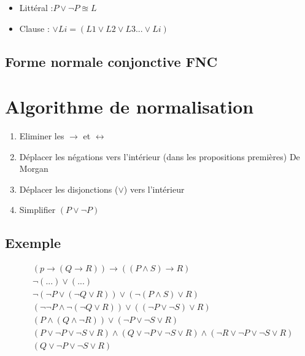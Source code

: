 \begin{itemize}
	\item Littéral :$ P \lor \lnot P \approxeq L$
	\item Clause : $\lor L{i} = ( L{1} \lor L{2} \lor L{3} ... \lor L{i} )$
\end{itemize}

\subsection{Forme normale conjonctive FNC}

\section{Algorithme de normalisation}

\begin{enumerate}
\item Eliminer les $\rightarrow$ et $\leftrightarrow$
\item Déplacer les négations vers l'intérieur (dans les propositions premières) De Morgan
\item Déplacer les disjonctions ($\lor$) vers l'intérieur
\item Simplifier $(P \lor \lnot P)$
\end{enumerate}

\subsection{Exemple}

\begin{align*}
& (p \rightarrow (Q \rightarrow R)) \rightarrow ((P \land S) \rightarrow R) \\
& \lnot ( ... ) \lor ( ... ) \\
& \lnot (\lnot P \lor (\lnot Q \lor R)) \lor (\lnot (P \land S) \lor R) \\
& ( \lnot \lnot P \land \lnot (\lnot Q \lor R)) \lor ((\lnot P \lor \lnot S) \lor R) \\
& (P \land (Q \land \lnot R)) \lor ( \lnot P \lor \lnot S \lor R) \\
& (P \lor \lnot P \lor \lnot S \lor R) \land ( Q \lor \lnot P \lor \lnot S \lor R) \land (\lnot R \lor \lnot P \lor \lnot S \lor R) \\
& (Q \lor \lnot P \lor \lnot S \lor R) 
\end{align*}

